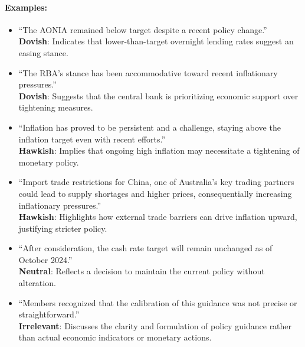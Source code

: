 \paragraph{Examples: }
\begin{itemize}
    \item ``The AONIA remained below target despite a recent policy change.''\\
    \textbf{Dovish}: Indicates that lower-than-target overnight lending rates suggest an easing stance.
    
    \item ``The RBA’s stance has been accommodative toward recent inflationary pressures.''\\
    \textbf{Dovish}: Suggests that the central bank is prioritizing economic support over tightening measures.
    
    \item ``Inflation has proved to be persistent and a challenge, staying above the inflation target even with recent efforts.''\\
    \textbf{Hawkish}: Implies that ongoing high inflation may necessitate a tightening of monetary policy.
    
    \item ``Import trade restrictions for China, one of Australia’s key trading partners could lead to supply shortages and higher prices, consequentially increasing inflationary pressures.''\\
    \textbf{Hawkish}: Highlights how external trade barriers can drive inflation upward, justifying stricter policy.
    
    \item ``After consideration, the cash rate target will remain unchanged as of October 2024.''\\
    \textbf{Neutral}: Reflects a decision to maintain the current policy without alteration.

    \item ``Members recognized that the calibration of this guidance was not precise or straightforward.''\\
    \textbf{Irrelevant}: Discusses the clarity and formulation of policy guidance rather than actual economic indicators or monetary actions.
\end{itemize}


\newpage

